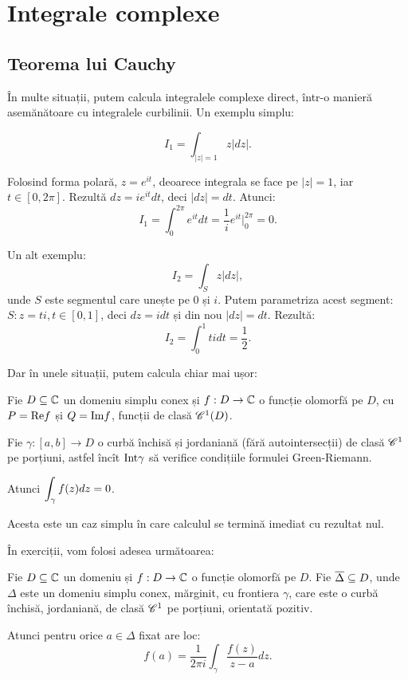 \chapter{Integrale complexe}



\section{Teorema lui Cauchy}
\indent\indent În multe situații, putem calcula integralele complexe direct,
într-o manieră asemănătoare cu integralele curbilinii. Un exemplu simplu:

\[
  I_1 = \int_{|z| = 1} z |dz|.
\]

Folosind forma polară, $ z = e^{it} $, deoarece integrala se face pe
$ |z| = 1 $, iar $ t \in [0, 2\pi] $. Rezultă $ dz = ie^{it} dt $,
deci $ |dz| = dt $. Atunci:
\[
  I_1 = \int_0^{2\pi} e^{it} dt = \dfrac{1}{i} e^{it} \Big|_0^{2\pi} = 0.
\]

Un alt exemplu:
\[
  I_2 = \int_S z |dz|,
\]
unde $ S $ este segmentul care unește pe $ 0 $ și $ i $. Putem parametriza
acest segment: $S : z = ti, t \in [0,1] $, deci $ dz = idt $ și din nou
$ |dz| = dt $. Rezultă:
\[
  I_2 = \int_0^1 tidt = \dfrac{1}{2}.
\]

Dar în unele situații, putem calcula chiar mai ușor:
\begin{theorem}[Cauchy]\label{thm:tcauchy} 
  Fie $ D \subseteq \mathbb{C} $ un domeniu simplu conex și $ f : D \to \mathbb{C} $ o funcție
  olomorfă pe $ D $, cu $ P = \mathrm{Re}f $ și $ Q = \mathrm{Im} f $, funcții de clasă
  $ \mathscr{C}^1(D) $.

  Fie $ \gamma : [a, b] \to D $ o curbă închisă și jordaniană (fără autointersecții)
  de clasă $ \mathscr{C}^1 $ pe porțiuni, astfel încît $ \mathrm{Int}\gamma $ să verifice
  condițiile formulei Green-Riemann.

  Atunci $ \displaystyle\int_\gamma f(z) dz = 0 $.
\end{theorem}

Acesta este un caz simplu în care calculul se termină imediat cu rezultat nul.

În exerciții, vom folosi adesea următoarea:
\begin{theorem}\label{thm:fintcauchy}
  Fie $ D \subseteq \mathbb{C} $ un domeniu și $ f : D \to \mathbb{C} $ o funcție olomorfă pe $ D $.
  Fie $ \overline{\Delta} \subseteq D $, unde $ \Delta $ este un domeniu simplu conex,
  mărginit, cu frontiera $ \gamma $, care este o curbă închisă, jordaniană, de
  clasă $ \mathscr{C}^1 $ pe porțiuni, orientată pozitiv.

  Atunci pentru orice $ a \in \Delta $ fixat are loc:
  \[
    f(a) = \dfrac{1}{2 \pi i} \int_\gamma \dfrac{f(z)}{z - a} dz.
  \]
\end{theorem}

